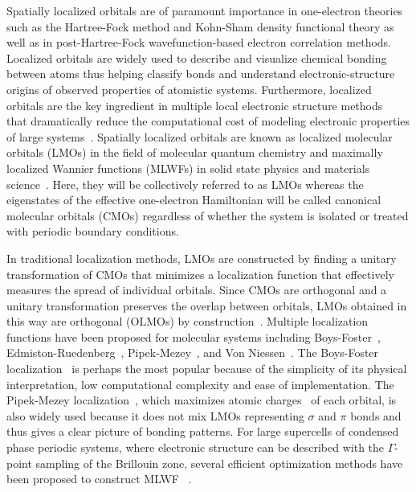 \documentclass[aps,prl,reprint,amsmath,amssymb]{revtex4-1}
\begin{document}
Spatially localized orbitals are of paramount importance in one-electron theories such as the Hartree-Fock method and Kohn-Sham density functional theory as well as in post-Hartree-Fock wavefunction-based electron correlation methods.
Localized orbitals are widely used to describe and visualize chemical bonding between atoms thus helping classify bonds and understand electronic-structure origins of observed properties of atomistic systems. 
Furthermore, localized orbitals are the key ingredient in multiple local electronic structure methods~\cite{goedecker1994efficient, bowler2012methods, zalesny2011linear, pulay1986orbital, saebo2001low, pisani2005local, hampel1996local, forner1997numerical} that dramatically reduce the computational cost of modeling electronic properties of large systems~\cite{saebo1993local, schutz1999low, hetzer2000low, schutz2001low}.
Spatially localized orbitals are known as localized molecular orbitals (LMOs) in the field of molecular quantum chemistry and maximally localized Wannier functions (MLWFs) in solid state physics and materials science~\cite{marzari2012maximally}. 
Here, they will be collectively referred to as LMOs whereas the eigenstates of the effective one-electron Hamiltonian will be called canonical molecular orbitals (CMOs) regardless of whether the system is isolated or treated with periodic boundary conditions.

In traditional localization methods, LMOs are constructed by finding a unitary transformation of CMOs that minimizes a localization function that effectively measures the spread of individual orbitals. 
Since CMOs are orthogonal and a unitary transformation preserves the overlap between orbitals, LMOs obtained in this way are orthogonal (OLMOs) by construction~\cite{weinstein1971localized}.
Multiple localization functions have been proposed for molecular systems including Boys-Foster~\cite{boys1960construction}, Edmiston-Ruedenberg~\cite{bytautas2002electron, bytautas2003split, edmiston1963localized}, Pipek-Mezey~\cite{pipek1989a_fast}, and Von Niessen~\cite{niessen1972density}. The Boys-Foster localization~\cite{boys1960construction} is perhaps the most popular because of the simplicity of its physical interpretation, low computational complexity and ease of implementation. 
The Pipek-Mezey localization~\cite{pipek1989a_fast}, which maximizes atomic charges~\cite{mulliken1955electronic, lowdin1950non} of each orbital, is also widely used because it does not mix LMOs representing $\sigma$ and $\pi$ bonds and thus gives a clear picture of bonding patterns. 
For large supercells of condensed phase periodic systems, where electronic structure can be described with the $\Gamma$-point sampling of the Brillouin zone, several efficient optimization methods have been proposed to construct MLWF ~\cite{marzari2012maximally, resta1998quantum, resta1999electron, silvestrelli1999maximally, berghold2000general}. 
\end{document}
